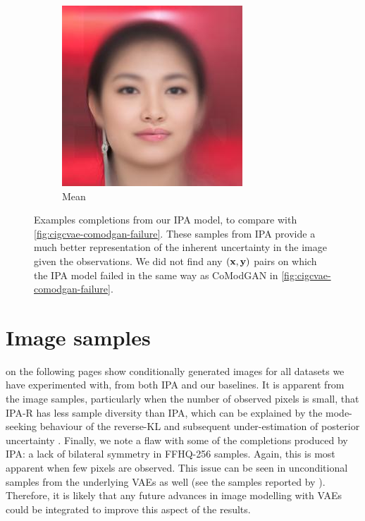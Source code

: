 \begin{figure}[t]
\begin{subfigure}[t]{0.1\textwidth}
    \includegraphics[height=\cmgfailureimgheight]{figs/cigcvae/co_mod_gan_failure/avg_aipo_56_4_12.jpg}
    \caption{Mean}
  \end{subfigure}
  \caption{Examples completions from our IPA model, to compare with
    \cref{fig:cigcvae-comodgan-failure}. These samples from IPA provide a much better
    representation of the inherent uncertainty in the image given the
    observations. We did not find any $(\mathbf{x}{}, \mathbf{y}{})$ pairs on which the IPA
    model failed in the same way as CoModGAN in \cref{fig:cigcvae-comodgan-failure}. }
  \label{fig:cigcvae-comodgan-failure-aipo}
\end{figure}

\section{Image samples}\label{supp:cigcvae-image-samples}


on the following pages show conditionally generated images for all datasets we have
experimented with, from both IPA and our baselines. It is apparent from the
image samples, particularly when the number of observed pixels is small, that
IPA-R has less sample diversity than IPA, which can be explained by the
mode-seeking behaviour of the reverse-KL and subsequent under-estimation of
posterior uncertainty \citep{minka2005divergence}. Finally, we note a flaw with
some of the completions produced by IPA: a lack of bilateral symmetry in
FFHQ-256 samples. Again, this is most apparent when few pixels are observed.
This issue can be seen in unconditional samples from the underlying VAEs as well
(see the samples reported by \citet{child2020very}). Therefore, it is likely
that any future advances in image modelling with VAEs could be integrated to
improve this aspect of the results.

